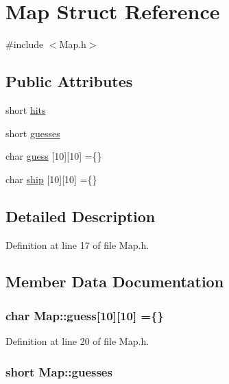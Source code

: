 \hypertarget{struct_map}{}\section{Map Struct Reference}
\label{struct_map}


{\ttfamily \#include $<$Map.\+h$>$}

\subsection*{Public Attributes}
\begin{DoxyCompactItemize}
\item 
short \hyperlink{struct_map_a4b81caa9d402a8edc30fb93869e7163e}{hits}
\item 
short \hyperlink{struct_map_a77bf60eb6e41fce7ee5ebd7582372a28}{guesses}
\item 
char \hyperlink{struct_map_a60684c774a0cb6da010399a63366b1ba}{guess} \mbox{[}10\mbox{]}\mbox{[}10\mbox{]} =\{\}
\item 
char \hyperlink{struct_map_a95d68a52f9a8a7c50c45e9ef63fe9a64}{ship} \mbox{[}10\mbox{]}\mbox{[}10\mbox{]} =\{\}
\end{DoxyCompactItemize}


\subsection{Detailed Description}


Definition at line 17 of file Map.\+h.



\subsection{Member Data Documentation}
\subsubsection[{\texorpdfstring{guess}{guess}}]{\setlength{\rightskip}{0pt plus 5cm}char Map\+::guess\mbox{[}10\mbox{]}\mbox{[}10\mbox{]} =\{\}}\hypertarget{struct_map_a60684c774a0cb6da010399a63366b1ba}{}\label{struct_map_a60684c774a0cb6da010399a63366b1ba}


Definition at line 20 of file Map.\+h.

\subsubsection[{\texorpdfstring{guesses}{guesses}}]{\setlength{\rightskip}{0pt plus 5cm}short Map\+::guesses}\hypertarget{struct_map_a77bf60eb6e41fce7ee5ebd7582372a28}{}\label{struct_map_a77bf60eb6e41fce7ee5ebd7582372a28}



